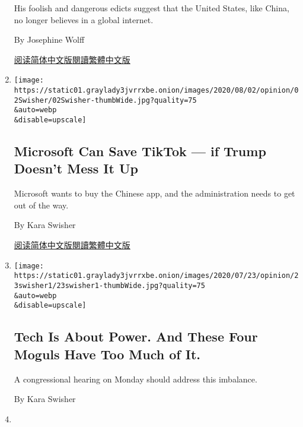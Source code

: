 \begin{enumerate}
  His foolish and dangerous edicts suggest that the United States, like
  China, no longer believes in a global internet.

  By Josephine Wolff

  \href{https://cn.nytimes3xbfgragh.onion/opinion/20200810/tiktok-wechat-china-trump-executive-order/}{阅读简体中文版}\href{https://cn.nytimes3xbfgragh.onion/opinion/20200810/tiktok-wechat-china-trump-executive-order/zh-hant/}{閱讀繁體中文版}
\item
  \href{/2020/08/02/opinion/02tik-tok-china-trump.html}{}

  \texttt{[image: https://static01.graylady3jvrrxbe.onion/images/2020/08/02/opinion/02Swisher/02Swisher-thumbWide.jpg?quality=75\\\&auto=webp\\\&disable=upscale]}

  \hypertarget{microsoft-can-save-tiktok--if-trump-doesnt-mess-it-up}{%
  \subsection{Microsoft Can Save TikTok --- if Trump Doesn't Mess It
  Up}\label{microsoft-can-save-tiktok--if-trump-doesnt-mess-it-up}}

  Microsoft wants to buy the Chinese app, and the administration needs
  to get out of the way.

  By Kara Swisher

  \href{https://cn.nytimes3xbfgragh.onion/opinion/20200804/tik-tok-china-trump/}{阅读简体中文版}\href{https://cn.nytimes3xbfgragh.onion/opinion/20200804/tik-tok-china-trump/zh-hant/}{閱讀繁體中文版}
\item
  \href{/2020/07/23/opinion/tech-moguls-congressional-hearing.html}{}

  \texttt{[image: https://static01.graylady3jvrrxbe.onion/images/2020/07/23/opinion/23swisher1/23swisher1-thumbWide.jpg?quality=75\\\&auto=webp\\\&disable=upscale]}

  \hypertarget{tech-is-about-power-and-these-four-moguls-have-too-much-of-it}{%
  \subsection{Tech Is About Power. And These Four Moguls Have Too Much
  of
  It.}\label{tech-is-about-power-and-these-four-moguls-have-too-much-of-it}}

  A congressional hearing on Monday should address this imbalance.

  By Kara Swisher
\item
  \href{/2020/07/22/style/crispr-gene-editing-ethics.html}{}


\end{enumerate}

